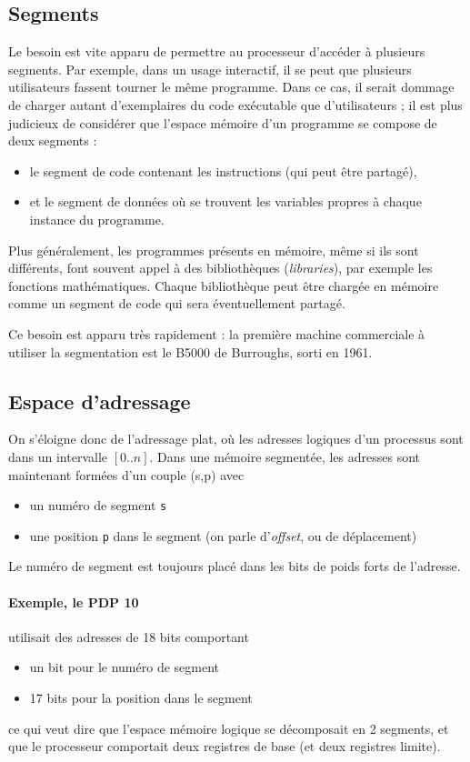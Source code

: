 \begin{multicols}{2}
\subsection{Segments}

Le besoin est vite apparu de permettre au processeur d'accéder à
plusieurs segments.  Par exemple, dans un usage interactif, il se peut
que plusieurs utilisateurs fassent tourner le même programme.  Dans ce
cas, il serait dommage de charger autant d'exemplaires du code
exécutable que d'utilisateurs ; il est plus judicieux de considérer
que l'espace mémoire d'un programme se compose de deux segments : 
\begin{itemize}
\item le
segment de code contenant les instructions (qui peut être partagé),
\item et le segment de données où se trouvent les variables propres à
chaque instance du programme.
\end{itemize}

Plus généralement, les programmes présents en mémoire, même si ils
sont différents, font souvent appel à des bibliothèques
(\emph{libraries}), par exemple les fonctions mathématiques.
Chaque bibliothèque peut être chargée en mémoire comme un segment
de code qui sera éventuellement partagé.

Ce besoin est apparu très rapidement : la première machine
commerciale à utiliser la segmentation est le B5000 de Burroughs,
 sorti en
1961.

\subsection{Espace d'adressage}

On s'éloigne donc de l'adressage plat, où les adresses logiques d'un
processus sont dans un intervalle $[0..n]$. Dans une mémoire segmentée,
les adresses sont maintenant
formées d'un couple (s,p) avec
\begin{itemize}
\item un numéro de segment \texttt{s} 
\item une position \texttt{p} dans le segment (on parle
  d'\emph{offset}, ou de déplacement)
\end{itemize}
Le numéro de segment est toujours placé dans les bits de poids forts
de l'adresse.


\paragraph{Exemple, le PDP  10} utilisait des adresses de 18 bits
 comportant 
\begin{itemize}
\item un bit pour le numéro de segment
\item 17 bits pour la position dans le segment
\end{itemize}
ce qui veut dire que l'espace mémoire logique se décomposait en 2
segments, et que le processeur comportait deux registres de base (et
deux registres limite).



\end{multicols}
